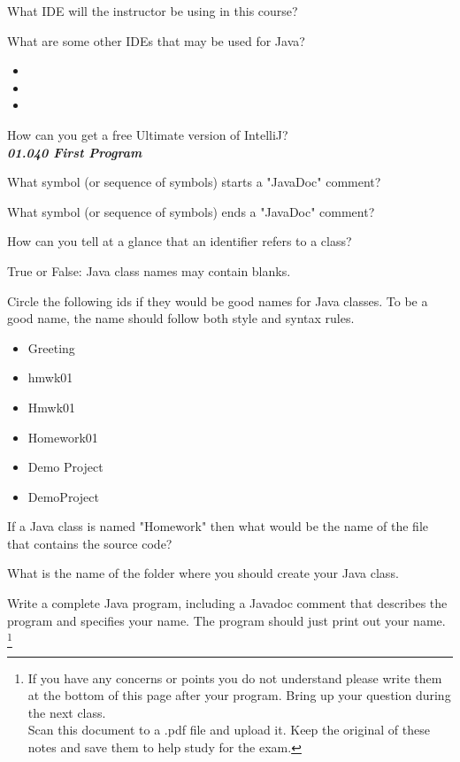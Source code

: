 \documentclass[11pt]{exam}
\begin{document}
\begin{questions}
\question What IDE will the instructor be using in this course?

\begin{samepage}
    \question What are some other IDEs that may be used for Java?
    \begin{itemize}
        \item 
        \item 
        \item 
    \end{itemize}
\end{samepage}

\question How can you get a free Ultimate version of IntelliJ?\\

\textit{\textbf{01.040 First Program}}

\question What symbol (or sequence of symbols) starts a "JavaDoc" comment?

\question What symbol (or sequence of symbols) ends a "JavaDoc" comment?

\question How can you tell at a glance that an identifier refers to a class?

\question True or False:  Java class names may contain blanks.

\begin{samepage}
    \question Circle the following ids if they would be good names for Java classes.  To be a good name, the name should follow both style and syntax rules.
    \begin{itemize}
        \item Greeting
        \item hmwk01
        \item Hmwk01
        \item Homework01
        \item Demo Project
        \item DemoProject
    \end{itemize}
\end{samepage}

\question If a Java class is named "Homework" then what would be the name of the file that contains the source code? \makebox[4cm]{\hrulefill}

\question What is the name of the folder where you should create your Java class.

\newpage
\question Write a complete Java program, including a Javadoc comment that describes the program and specifies your name.  The program should just print out your name.
\footnote{  If you have any concerns or points you do not understand please write them at the bottom of this page after your program. Bring up your question during the next class. \\Scan this document to a .pdf file and upload it.  Keep the original of these notes and save them to help study for the exam.}



\end{questions}
\end{document}
